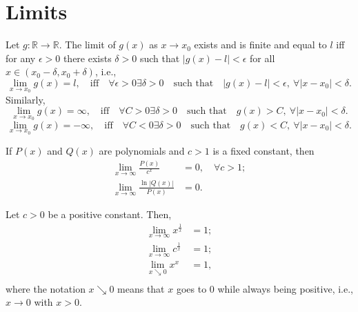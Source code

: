 \section{Limits}
\begin{definition}
    Let $ g : \mathbb{R} \rightarrow \mathbb{R} $.
    The limit of $ g(x) $ as $ x \rightarrow x_0 $ exists and is finite and equal to $ l $ iff for any $ \epsilon > 0 $ there exists $ \delta > 0 $ such that $ |g(x) - l| < \epsilon $ for all $ x \in (x_0 - \delta, x_0 + \delta) $, i.e.,
    \begin{equation*}
        \lim_{x \rightarrow x_0} g(x) = l, \quad \text{iff} \quad \forall \epsilon > 0 \exists \delta > 0 \quad \text{such that} \quad |g(x) - l| < \epsilon,\ \forall |x - x_0| < \delta.
    \end{equation*}
    Similarly,
    \begin{equation*}
        \lim_{x \rightarrow x_0} g(x) = \infty, \quad \text{iff} \quad \forall C > 0 \exists \delta > 0 \quad \text{such that} \quad g(x) > C,\ \forall |x - x_0| < \delta.
    \end{equation*}
    \begin{equation*}
        \lim_{x \rightarrow x_0} g(x) = -\infty, \quad \text{iff} \quad \forall C < 0 \exists \delta > 0 \quad \text{such that} \quad g(x) < C,\ \forall |x - x_0| < \delta.
    \end{equation*}
\end{definition}

\begin{theorem}
    If $ P(x) $ and $ Q(x) $ are polynomials and $ c > 1 $ is a fixed constant, then
    \begin{align}
        \lim_{x \rightarrow \infty} \frac{P(x)}{c^x} &= 0, \quad \forall c > 1; \\
        \lim_{x \rightarrow \infty} \frac{\ln |Q(x)|}{P(x)} &= 0.
    \end{align}
\end{theorem}

\begin{lemma}
    Let $ c > 0 $ be a positive constant.
    Then,
    \begin{align}
        \lim_{x \rightarrow \infty} x^{\frac{1}{x}} &= 1; \\
        \lim_{x \rightarrow \infty} c^{\frac{1}{x}} &= 1; \\
        \lim_{x \searrow 0} x^x &= 1, \\
    \end{align}
    where the notation $ x \searrow 0 $ means that $ x $ goes to 0 while always being positive, i.e., $ x \rightarrow 0 $ with $ x > 0 $.
\end{lemma}
